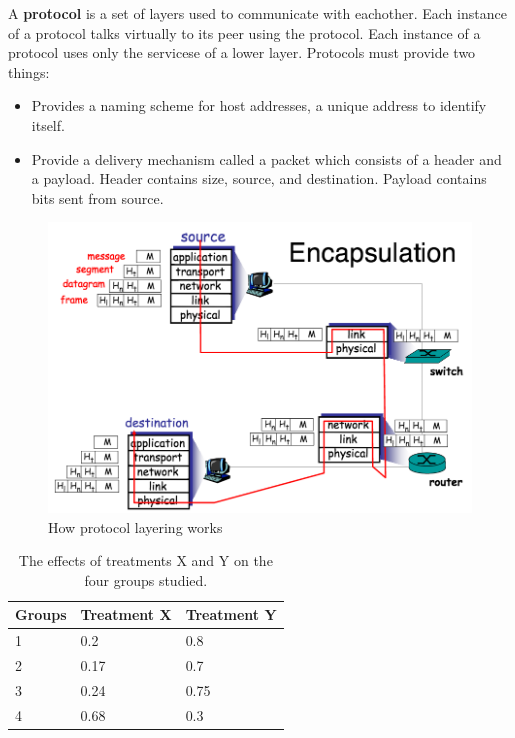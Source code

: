 \documentclass[15pt,idxtotoc,hyperref,openany]{labbook} %
\begin{document}
A {\bf  protocol } is a set of layers used to communicate with eachother.  Each instance of a protocol talks virtually to its peer using the protocol.  Each instance of a protocol uses only the servicese of a lower layer.  Protocols must provide two things:
\begin{itemize}
\item Provides a naming scheme for host addresses, a unique address to identify itself.
\item Provide a delivery mechanism called a packet which consists of a header and a payload.  Header contains size, source, and destination.  Payload contains bits sent from source.
\end{itemize}


\begin{figure}[H] %
\begin{center}
\includegraphics[width=.8\linewidth]{encapsulation}
\end{center}
\caption{How protocol layering works}
\label{fig:example_figure}
\end{figure}


\begin{table}[H]
\begin{tabular}{l l l}
\toprule
\textbf{Groups} & \textbf{Treatment X} & \textbf{Treatment Y} \\
\toprule
1 & 0.2 & 0.8\\
2 & 0.17 & 0.7\\
3 & 0.24 & 0.75\\
4 & 0.68 & 0.3\\
\bottomrule
\end{tabular}
\caption{The effects of treatments X and Y on the four groups studied.}
\label{tab:treatments_xy}
\end{table}
\end{document}
